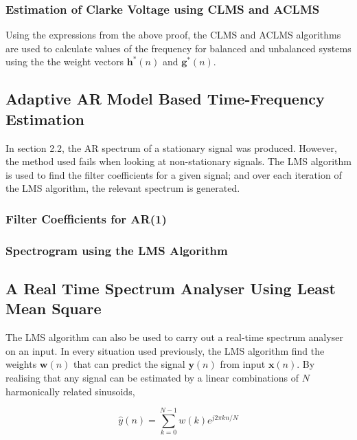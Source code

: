 \documentclass[main.tex]{subfiles}
\begin{document}
\subsubsection{Estimation of Clarke Voltage using CLMS and ACLMS}

Using the expressions from the above proof, the CLMS and ACLMS algorithms are used to calculate values of the frequency for balanced and unbalanced systems using the the weight vectors $\textbf{h}^*(n)$ and $\textbf{g}^*(n)$. 

\subsection{Adaptive AR Model Based Time-Frequency Estimation}

In section 2.2, the AR spectrum of a stationary signal was produced. However, the method used fails when looking at non-stationary signals. The LMS algorithm is used to find the filter coefficients for a given signal; and over each iteration of the LMS algorithm, the relevant spectrum is generated. 

\subsubsection{Filter Coefficients for AR(1)}

\subsubsection{Spectrogram using the LMS Algorithm}







\subsection{A Real Time Spectrum Analyser Using Least Mean Square}

The LMS algorithm can also be used to carry out a real-time spectrum analyser on an input. In every situation used previously, the LMS algorithm find the weights $\textbf{w}(n)$ that can predict the signal $\textbf{y}(n)$ from input $\textbf{x}(n)$. By realising that any signal can be estimated by a linear combinations of $N$ harmonically related sinusoids,

\begin{equation}
\hat{y}(n) = \sum_{k=0}^{N-1}w(k)e^{j2\pi kn/N} \label{eq-4-3-a-yhat}
\end{equation}
\end{document}
